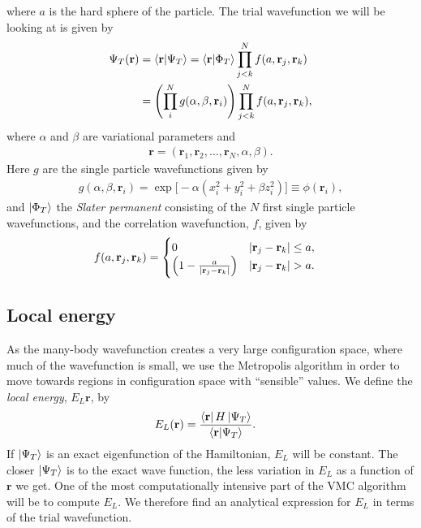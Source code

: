 \documentclass[
    a4paper, aps, twocolumn, floatfix, superscriptaddress]{revtex4-1}
\newcommand{\vf}{\mathbf}
\newcommand{\1}{\mathds{1}}
\begin{document}
    where $a$ is the hard sphere of the particle. The trial wavefunction we will
    be looking at is given by
    \begin{align}
        \Psi_T(\vf{r})
        &= \bra{\vf{r}}\ket{\Psi_T}
        = \bra{\vf{r}}\ket{\Phi_T}
        \prod_{j < k}^N f(a, \vf{r}_j, \vf{r}_k) \\
        &= \Biggl(
            \prod_i^N g(\alpha, \beta, \vf{r}_i)
        \Biggr)
        \prod_{j < k}^N f(a, \vf{r}_j, \vf{r}_k),
    \end{align}
    where $\alpha$ and $\beta$ are variational parameters and
    \begin{align}
        \vf{r} = (\vf{r}_1, \vf{r}_2, \dots, \vf{r}_N, \alpha, \beta).
    \end{align}
    Here $g$ are the single particle wavefunctions given by
    \begin{align}
        g(\alpha, \beta, \vf{r}_i)
        = \exp\bigl[
            -\alpha(x_i^2 + y_i^2 + \beta z_i^2)
        \bigr] \equiv \phi(\vf{r}_i),
    \end{align}
    and $\ket{\Phi_T}$ the \textit{Slater permanent} consisting of the $N$ first
    single particle wavefunctions, and the correlation wavefunction, $f$, given
    by
    \begin{align}
        f(a, \vf{r}_j, \vf{r}_k)
        &=
        \begin{cases}
            0 & |\vf{r}_j - \vf{r}_k| \leq a, \\
            \Bigl(
                1 - \frac{a}{|\vf{r}_j - \vf{r}_k|}
            \Bigr) & |\vf{r}_j - \vf{r}_k| > a.
        \end{cases}
    \end{align}

    \subsection{Local energy}
        As the many-body wavefunction creates a very large configuration space,
        where much of the wavefunction is small, we use the Metropolis algorithm
        in order to move towards regions in configuration space with
        ``sensible'' values. We define the \textit{local energy}, $E_L{\vf{r}}$,
        by
        \begin{align}
            E_L(\vf{r})
            &= \frac{\bra{\vf{r}}H\ket{\Psi_T}}{\bra{\vf{r}}\ket{\Psi_T}}.
        \end{align}
        If $\ket{\Psi_T}$ is an exact eigenfunction of the Hamiltonian, $E_L$
        will be constant. The closer $\ket{\Psi_T}$ is to the exact wave
        function, the less variation in $E_L$ as a function of $\vf{r}$ we get.
        One of the most computationally intensive part of the VMC algorithm will
        be to compute $E_L$. We therefore find an analytical expression for
        $E_L$ in terms of the trial wavefunction.
\end{document}
